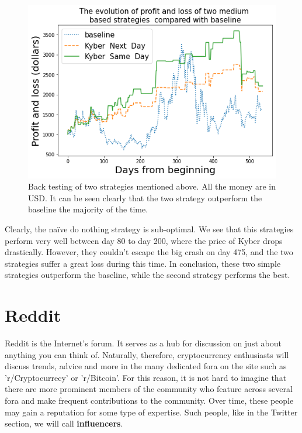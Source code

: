 \documentclass[twoside]{report}
\begin{document}
\begin{spacing}{1}
\begin{figure}[!h]
    \centering
    \includegraphics[scale =  0.65]{Images/medium backtesting.png}
    \caption{Back testing of two strategies mentioned above. All the money are in USD. It can be seen clearly that the two strategy outperform the baseline the majority of the time.}
    \label{backtest medium}
\end{figure}

Clearly, the naïve do nothing strategy is sub-optimal. We see that this strategies perform very well between day 80 to day 200, where the price of Kyber drops drastically. However, they couldn't escape the big crash on day 475, and the two strategies suffer a great loss during this time. In conclusion, these two simple strategies outperform the baseline, while the second strategy performs the best.

\section{Reddit}\label{reddit}
Reddit is the Internet's forum. It serves as a hub for discussion on just about anything you can think of. Naturally, therefore, cryptocurrency enthusiasts will discuss trends, advice and more in the many dedicated fora on the site such as 'r/Cryptocurrecy' or 'r/Bitcoin'. For this reason, it is not hard to imagine that there are more prominent members of the community who feature across several fora and make frequent contributions to the community. Over time, these people may gain a reputation for some type of expertise. Such people, like in the Twitter section, we will call  \textbf{influencers}. 


\end{spacing}
\end{document}
